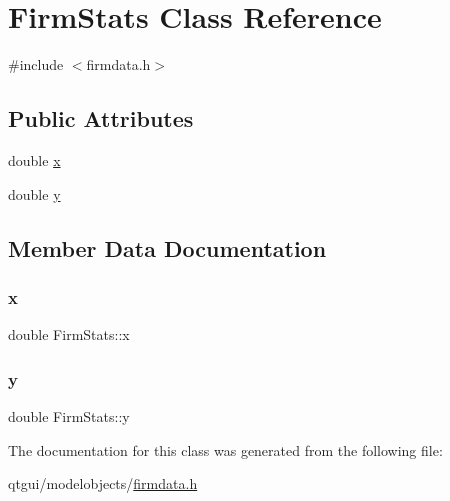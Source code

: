 \hypertarget{class_firm_stats}{}\section{Firm\+Stats Class Reference}
\label{class_firm_stats}


{\ttfamily \#include $<$firmdata.\+h$>$}

\subsection*{Public Attributes}
\begin{DoxyCompactItemize}
\item 
double \mbox{\hyperlink{class_firm_stats_aa37fbd6ad1265400571b555781d37dd5}{x}}
\item 
double \mbox{\hyperlink{class_firm_stats_ac0b5cececece62a671e5b34b12431367}{y}}
\end{DoxyCompactItemize}


\subsection{Member Data Documentation}
\mbox{\label{class_firm_stats_aa37fbd6ad1265400571b555781d37dd5}} 
\subsubsection{\texorpdfstring{x}{x}}
{\footnotesize\ttfamily double Firm\+Stats\+::x}

\mbox{\label{class_firm_stats_ac0b5cececece62a671e5b34b12431367}} 
\subsubsection{\texorpdfstring{y}{y}}
{\footnotesize\ttfamily double Firm\+Stats\+::y}



The documentation for this class was generated from the following file\+:\begin{DoxyCompactItemize}
\item 
qtgui/modelobjects/\mbox{\hyperlink{firmdata_8h}{firmdata.\+h}}\end{DoxyCompactItemize}
